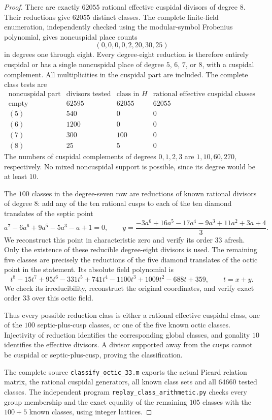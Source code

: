 \begin{proof}
There are exactly $62055$ rational effective cuspidal divisors of
degree $8$. Their reductions give $62055$ distinct classes.
The complete finite-field enumeration, independently checked using
the modular-symbol Frobenius polynomial, gives noncuspidal place counts
\[
 (0,0,0,0,2,20,30,25)
\]
in degrees one through eight.
Every degree-eight reduction is therefore entirely cuspidal or
has a single noncuspidal place of degree $5$, $6$, $7$, or $8$,
with a cuspidal complement. All multiplicities in the cuspidal part
are included. The complete class tests are
\[
\begin{array}{c|r|r|r}
\text{noncuspidal part}&\text{divisors tested}&
 \text{class in }H&\text{rational effective cuspidal classes}\\\hline
\text{empty}&62595&62055&62055\\
(5)&540&0&0\\
(6)&1200&0&0\\
(7)&300&100&0\\
(8)&25&5&0
\end{array}
\]
The numbers of cuspidal complements of degrees $0,1,2,3$ are
$1,10,60,270$, respectively. No mixed noncuspidal support is possible,
since its degree would be at least $10$.

The $100$ classes in the degree-seven row are reductions of known
rational divisors of degree $8$: add any of the ten rational cusps
to each of the ten diamond translates of the septic point
\[
 a^7-6a^6+9a^5-5a^3-a+1=0,\qquad
 y=\frac{-3a^6+16a^5-17a^4-9a^3+11a^2+3a+4}{3}.
\]
We reconstruct this point in characteristic zero and verify its order
$33$ afresh. Only the existence of these reducible degree-eight
divisors is used.
The remaining five classes are precisely the reductions of the five
diamond translates of the octic point in the statement.
Its absolute field polynomial is
\[
 t^8-15t^7+95t^6-331t^5+741t^4-1100t^3+1009t^2-688t+359,
 \qquad t=x+y.
\]
We check its irreducibility, reconstruct the original coordinates,
and verify exact order $33$ over this octic field.

Thus every possible reduction class is either a rational effective
cuspidal class, one of the $100$ septic-plus-cusp classes, or one
of the five known octic classes. Injectivity of reduction identifies
the corresponding global classes, and gonality $10$ identifies the
effective divisors. A divisor supported away from the cusps cannot
be cuspidal or septic-plus-cusp, proving the classification.

The complete source \texttt{classify\_octic\_33.m} exports the actual
Picard relation matrix, the rational cuspidal generators, all known
class sets and all $64660$ tested classes. The independent program
\texttt{replay\_class\_arithmetic.py} checks every group membership
and the exact equality of the remaining $105$ classes with the
$100+5$ known classes, using integer lattices.


\end{proof}
